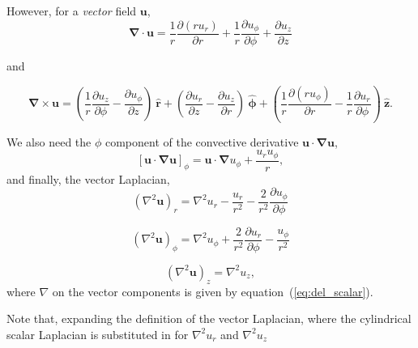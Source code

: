 \documentclass{paper}
\newcommand{\uphi}{\ensuremath{u_\phi}}
\newcommand{\rhat}{\ensuremath{\mathbf{\hat{r}}}}
\newcommand{\phihat}{\ensuremath{\mathbf{\hat{\phi}}}}
\newcommand{\zhat}{\ensuremath{\mathbf{\hat{z}}}}
\begin{document}
However, for a \emph{vector} field $\mathbf{u}$,
\begin{equation}
  \label{eq:div}
  \mathbf{\nabla \cdot u} = \frac{1}{r} \frac{\partial (r u_r)}{\partial r} + \frac{1}{r} \frac{\partial \uphi}{\partial \phi}  + \frac{\partial u_z}{\partial z}
\end{equation}

and 

\begin{equation}
  \label{eq:curl}
  \mathbf{\nabla \times u} = \left( \frac{1}{r} \frac{\partial u_z}{\partial \phi} - \frac{\partial u_\phi}{\partial z}\right)\ \rhat + \left(\frac{\partial u_r}{\partial z} - \frac{\partial u_z}{\partial r}\right)\ \phihat  + \left( \frac{1}{r} \frac{\partial (r \uphi)}{\partial r} - \frac{1}{r}\frac{\partial u_r}{\partial \phi}\right)\ \zhat.
\end{equation}

We also need the $\phi$ component of the convective derivative $\mathbf{u \cdot \nabla u}$,
\begin{equation}
  \label{eq:convective_deriv_phi}
  \left[\mathbf{u \cdot \nabla u} \right]_\phi = \mathbf{u \cdot \nabla} \uphi + \frac{ u_r \uphi}{r},
\end{equation}
and finally, the vector Laplacian,
\begin{equation}
  \label{eq:vec_lap_r}
  (\nabla^2 \mathbf{u})_r = \nabla^2 u_r - \frac{u_r}{r^2} - \frac{2}{r^2} \frac{\partial \uphi}{\partial \phi}
\end{equation}

\begin{equation}
  \label{eq:vec_lap_phi}
  (\nabla^2 \mathbf{u})_\phi = \nabla^2 u_\phi + \frac{2}{r^2} \frac{\partial u_r}{\partial \phi} - \frac{u_\phi}{r^2} 
\end{equation}

\begin{equation}
  \label{eq:vec_lap_z}
  (\nabla^2 \mathbf{u})_z = \nabla^2 u_z,
\end{equation}
where $\nabla$ on the vector components is given by equation~(\ref{eq:del_scalar}).

Note that, expanding the definition of the vector Laplacian, where the cylindrical scalar Laplacian is substituted in for $\nabla^2 u_r$ and $\nabla^2 u_z$  
\end{document}
